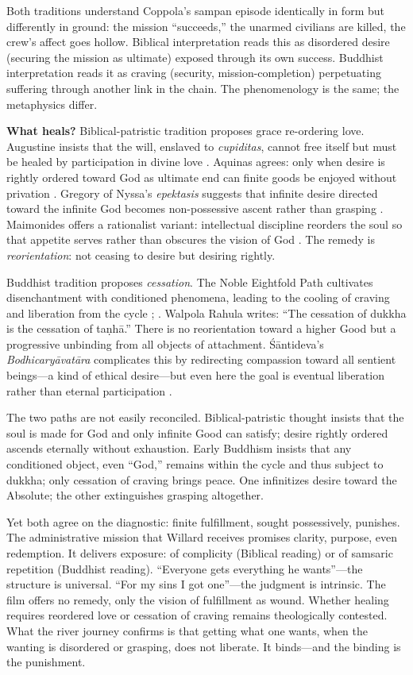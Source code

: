 Both traditions understand Coppola's sampan episode identically in form but differently in
ground: the mission ``succeeds,'' the unarmed civilians are killed, the crew's affect goes
hollow. Biblical interpretation reads this as disordered desire (securing the mission as
ultimate) exposed through its own success. Buddhist interpretation reads it as craving
(security, mission-completion) perpetuating suffering through another link in the chain. The
phenomenology is the same; the metaphysics differ.

\textbf{What heals?} Biblical-patristic tradition proposes grace re-ordering love. Augustine
insists that the will, enslaved to \emph{cupiditas}, cannot free itself but must be healed by
participation in divine love . Aquinas agrees: only when desire
is rightly ordered toward God as ultimate end can finite goods be enjoyed without privation
. Gregory of Nyssa's \emph{epektasis} suggests that infinite desire
directed toward the infinite God becomes non-possessive ascent rather than grasping
. Maimonides offers a rationalist variant: intellectual
discipline reorders the soul so that appetite serves rather than obscures the vision of God
. The remedy is \emph{reorientation}: not ceasing to desire
but desiring rightly.

Buddhist tradition proposes \emph{cessation}. The Noble Eightfold Path cultivates
disenchantment with conditioned phenomena, leading to the cooling of craving and liberation
from the cycle \parencite{Rahula1959}; \parencite{Gethin1998}. Walpola Rahula writes: ``The
cessation of dukkha is the cessation of taṇhā.'' There is no reorientation toward a higher
Good but a progressive unbinding from all objects of attachment. Śāntideva's
\emph{Bodhicaryāvatāra} complicates this by redirecting compassion toward all sentient
beings---a kind of ethical desire---but even here the goal is eventual liberation rather than
eternal participation \parencite{SantidevaBCA1995}.

The two paths are not easily reconciled. Biblical-patristic thought insists that the soul is
made for God and only infinite Good can satisfy; desire rightly ordered ascends eternally
without exhaustion. Early Buddhism insists that any conditioned object, even ``God,'' remains
within the cycle and thus subject to dukkha; only cessation of craving brings peace. One
infinitizes desire toward the Absolute; the other extinguishes grasping altogether.

Yet both agree on the diagnostic: finite fulfillment, sought possessively, punishes. The
administrative mission that Willard receives promises clarity, purpose, even redemption. It
delivers exposure: of complicity (Biblical reading) or of samsaric repetition (Buddhist
reading). ``Everyone gets everything he wants''---the structure is universal. ``For my sins I
got one''---the judgment is intrinsic. The film offers no remedy, only the vision of
fulfillment as wound. Whether healing requires reordered love or cessation of craving remains
theologically contested. What the river journey confirms is that getting what one wants, when
the wanting is disordered or grasping, does not liberate. It binds---and the binding is the
punishment.

